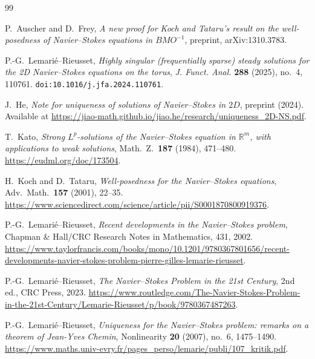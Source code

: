 \documentclass[12pt]{article}
\newcommand{\R}{\mathbb{R}}
\theoremstyle{remark}
\theoremstyle{remark}
\begin{document}
\begin{thebibliography}{99}

P.~Auscher and D.~Frey,
\newblock \emph{A new proof for Koch and Tataru's result on the well-posedness of Navier--Stokes equations in $BMO^{-1}$},
\newblock preprint, arXiv:1310.3783.

P.-G.~Lemari\'e--Rieusset,
\newblock \emph{Highly singular (frequentially sparse) steady solutions for the {2D} {Navier--Stokes} equations on the torus},
\newblock \emph{J. Funct. Anal.} \textbf{288} (2025), no.~4, 110761.
\newblock \texttt{doi:10.1016/j.jfa.2024.110761}.

J.~He,
\newblock \emph{Note for uniqueness of solutions of Navier--Stokes in $2D$},
\newblock preprint (2024).
\newblock Available at \url{https://jiao-math.github.io/jiao.he/research/uniqueness_2D-NS.pdf}.

T.~Kato,
\newblock \emph{Strong $L^p$-solutions of the Navier--Stokes equation in $\R^m$, with applications to weak solutions},
\newblock Math.\ Z.\ \textbf{187} (1984), 471--480.
\newblock \url{https://eudml.org/doc/173504}.

H.~Koch and D.~Tataru,
\newblock \emph{Well-posedness for the Navier--Stokes equations},
\newblock Adv.\ Math.\ \textbf{157} (2001), 22--35.
\newblock \url{https://www.sciencedirect.com/science/article/pii/S0001870800919376}.

P.-G.~Lemari\'e--Rieusset,
\newblock \emph{Recent developments in the Navier--Stokes problem},
\newblock Chapman \& Hall/CRC Research Notes in Mathematics, 431, 2002.
\newblock \url{https://www.taylorfrancis.com/books/mono/10.1201/9780367801656/recent-developments-navier-stokes-problem-pierre-gilles-lemarie-rieusset}.

P.-G.~Lemari\'e--Rieusset,
\newblock \emph{The Navier--Stokes Problem in the 21st Century}, 2nd ed.,
\newblock CRC Press, 2023.
\newblock \url{https://www.routledge.com/The-Navier-Stokes-Problem-in-the-21st-Century/Lemarie-Rieusset/p/book/9780367487263}.

P.-G.~Lemari\'e--Rieusset,
\newblock \emph{Uniqueness for the Navier--Stokes problem: remarks on a theorem of Jean-Yves Chemin},
\newblock Nonlinearity \textbf{20} (2007), no.~6, 1475--1490.
\newblock \url{https://www.maths.univ-evry.fr/pages_perso/lemarie/publi/107_kritik.pdf}.


\end{thebibliography}
\end{document}
